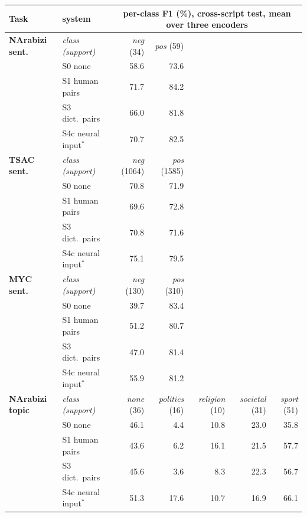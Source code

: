 \begin{tabular}{@{}llrrrrr@{}}
\toprule
Task & system & \multicolumn{5}{c}{per-class F1 (\%), cross-script test, mean over three encoders}\\
\midrule
\textbf{NArabizi sent.} & \textit{class (support)} & \textit{neg} (34) & \textit{pos} (59) &  &  & \\
 & S0 none & 58.6 & 73.6 &  &  & \\
 & S1 human pairs & 71.7 & 84.2 &  &  & \\
 & S3 dict.\ pairs & 66.0 & 81.8 &  &  & \\
 & S4c neural input$^{\ast}$ & 70.7 & 82.5 &  &  & \\
\addlinespace
\textbf{TSAC sent.} & \textit{class (support)} & \textit{neg} (1064) & \textit{pos} (1585) &  &  & \\
 & S0 none & 70.8 & 71.9 &  &  & \\
 & S1 human pairs & 69.6 & 72.8 &  &  & \\
 & S3 dict.\ pairs & 70.8 & 71.6 &  &  & \\
 & S4c neural input$^{\ast}$ & 75.1 & 79.5 &  &  & \\
\addlinespace
\textbf{MYC sent.} & \textit{class (support)} & \textit{neg} (130) & \textit{pos} (310) &  &  & \\
 & S0 none & 39.7 & 83.4 &  &  & \\
 & S1 human pairs & 51.2 & 80.7 &  &  & \\
 & S3 dict.\ pairs & 47.0 & 81.4 &  &  & \\
 & S4c neural input$^{\ast}$ & 55.9 & 81.2 &  &  & \\
\addlinespace
\textbf{NArabizi topic} & \textit{class (support)} & \textit{none} (36) & \textit{politics} (16) & \textit{religion} (10) & \textit{societal} (31) & \textit{sport} (51)\\
 & S0 none & 46.1 & 4.4 & 10.8 & 23.0 & 35.8\\
 & S1 human pairs & 43.6 & 6.2 & 16.1 & 21.5 & 57.7\\
 & S3 dict.\ pairs & 45.6 & 3.6 & 8.3 & 22.3 & 56.7\\
 & S4c neural input$^{\ast}$ & 51.3 & 17.6 & 10.7 & 16.9 & 66.1\\
\bottomrule
\end{tabular}
